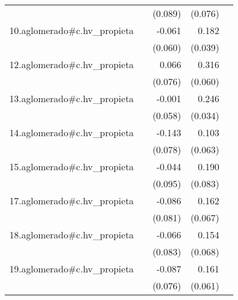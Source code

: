 {\begin{longtable}{l*{4}{D{.}{.}{-1}}}
            &                     &     (0.089)         &     (0.076)         &                     \\
\addlinespace
10.aglomerado#c.hv\_propieta&                     &      -0.061         &       0.182\sym{***}&                     \\
            &                     &     (0.060)         &     (0.039)         &                     \\
\addlinespace
12.aglomerado#c.hv\_propieta&                     &       0.066         &       0.316\sym{***}&                     \\
            &                     &     (0.076)         &     (0.060)         &                     \\
\addlinespace
13.aglomerado#c.hv\_propieta&                     &      -0.001         &       0.246\sym{***}&                     \\
            &                     &     (0.058)         &     (0.034)         &                     \\
\addlinespace
14.aglomerado#c.hv\_propieta&                     &      -0.143         &       0.103         &                     \\
            &                     &     (0.078)         &     (0.063)         &                     \\
\addlinespace
15.aglomerado#c.hv\_propieta&                     &      -0.044         &       0.190\sym{*}  &                     \\
            &                     &     (0.095)         &     (0.083)         &                     \\
\addlinespace
17.aglomerado#c.hv\_propieta&                     &      -0.086         &       0.162\sym{*}  &                     \\
            &                     &     (0.081)         &     (0.067)         &                     \\
\addlinespace
18.aglomerado#c.hv\_propieta&                     &      -0.066         &       0.154\sym{*}  &                     \\
            &                     &     (0.083)         &     (0.068)         &                     \\
\addlinespace
19.aglomerado#c.hv\_propieta&                     &      -0.087         &       0.161\sym{**} &                     \\
            &                     &     (0.076)         &     (0.061)         &                     \\

\end{longtable}}
